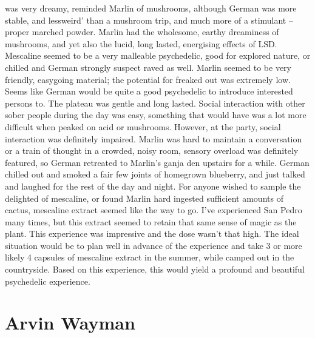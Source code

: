 \documentclass[12pt]{book}
\begin{document}
was very dreamy, reminded Marlin of mushrooms, although German was more stable, and lessweird' than a mushroom trip, and much more of a stimulant -- proper marched powder. Marlin had the wholesome, earthy dreaminess of mushrooms, and yet also the lucid, long lasted, energising effects of LSD. Mescaline seemed to be a very malleable psychedelic, good for explored nature, or chilled and German strongly suspect raved as well. Marlin seemed to be very friendly, easygoing material; the potential for freaked out was extremely low. Seems like German would be quite a good psychedelic to introduce interested persons to. The plateau was gentle and long lasted. Social interaction with other sober people during the day was easy, something that would have was a lot more difficult when peaked on acid or mushrooms. However, at the party, social interaction was definitely impaired. Marlin was hard to maintain a conversation or a train of thought in a crowded, noisy room, sensory overload was definitely featured, so German retreated to Marlin's ganja den upstairs for a while. German chilled out and smoked a fair few joints of homegrown blueberry, and just talked and laughed for the rest of the day and night. For anyone wished to sample the delighted of mescaline, or found Marlin hard ingested sufficient amounts of cactus, mescaline extract seemed like the way to go. I've experienced San Pedro many times, but this extract seemed to retain that same sense of magic as the plant. This experience was impressive and the dose wasn't that high. The ideal situation would be to plan well in advance of the experience and take 3 or more likely 4 capsules of mescaline extract in the summer, while camped out in the countryside. Based on this experience, this would yield a profound and beautiful psychedelic experience.



\chapter{Arvin Wayman}
\end{document}
